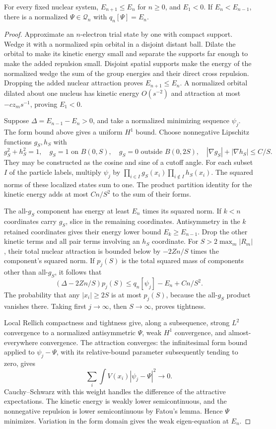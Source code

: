 \begin{lemma}
\label{lem:sector-compactness}
For every fixed nuclear system, $E_{n+1}\leq E_n$ for $n\geq0$, and
$E_1<0$.  If $E_n<E_{n-1}$, there is a normalized
$\Psi\in\mathcal Q_n$ with $q_n[\Psi]=E_n$.
\end{lemma}

\begin{proof}
Approximate an $n$-electron trial state by one with compact support.
Wedge it with a normalized spin orbital in a disjoint distant ball.
Dilate the orbital to make its kinetic energy small and separate the
supports far enough to make the added repulsion small.  Disjoint spatial
supports make the energy of the normalized wedge the sum of the group
energies and their direct cross repulsion.  Dropping the added nuclear
attraction proves $E_{n+1}\leq E_n$.  A normalized orbital dilated about
one nucleus has kinetic energy $O(s^{-2})$ and attraction at most
$-c z_m s^{-1}$, proving $E_1<0$.

Suppose $\Delta=E_{n-1}-E_n>0$, and take a normalized minimizing sequence
$\psi_j$.  The form bound above gives a uniform $H^1$ bound.  Choose
nonnegative Lipschitz functions $g_S,h_S$ with
\[
 g_S^2+h_S^2=1,\quad g_S=1\text{ on }B(0,S),\quad
 g_S=0\text{ outside }B(0,2S),\quad
 |\nabla g_S|+|\nabla h_S|\leq C/S.
\]
They may be constructed as the cosine and sine of a cutoff angle.
For each subset $I$ of the particle labels, multiply $\psi_j$ by
$\prod_{i\in I}g_S(x_i)\prod_{i\notin I}h_S(x_i)$.  The squared norms of
these localized states sum to one.  The product partition identity for
the kinetic energy adds at most $Cn/S^2$ to the sum of their forms.

The all-$g_S$ component has energy at least $E_n$ times its squared
norm.  If $k<n$ coordinates carry $g_S$, slice in the remaining
coordinates.  Antisymmetry in the $k$ retained coordinates gives their
energy lower bound $E_k\geq E_{n-1}$.  Drop the other kinetic terms and
all pair terms involving an $h_S$ coordinate.  For
$S>2\max_m|R_m|$, their total nuclear attraction is bounded below by
$-2Zn/S$ times the component's squared norm.  If $p_j(S)$ is the total
squared mass of components other than all-$g_S$, it follows that
\[
 (\Delta-2Zn/S)p_j(S)
 \leq q_n[\psi_j]-E_n+Cn/S^2.
\]
The probability that any $|x_i|\geq2S$ is at most $p_j(S)$, because the
all-$g_S$ product vanishes there.  Taking first $j\to\infty$, then
$S\to\infty$, proves tightness.

Local Rellich compactness and tightness give, along a subsequence,
strong $L^2$ convergence to a normalized antisymmetric $\Psi$, weak
$H^1$ convergence, and almost-everywhere convergence.  The attraction
converges: the infinitesimal form bound applied to $\psi_j-\Psi$, with
its relative-bound parameter subsequently tending to zero, gives
\[
 \sum_i\int V(x_i)|\psi_j-\Psi|^2\longrightarrow0.
\]
Cauchy--Schwarz with this weight handles the difference of the
attractive expectations.  The kinetic energy is weakly lower
semicontinuous, and the nonnegative repulsion is lower semicontinuous
by Fatou's lemma.  Hence $\Psi$ minimizes.  Variation in the form
domain gives the weak eigen-equation at $E_n$.
\end{proof}

